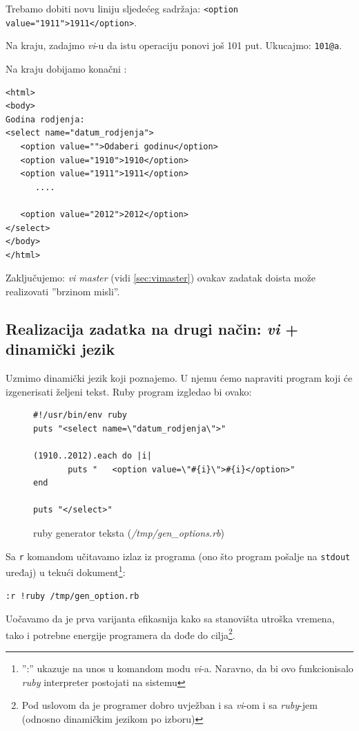 \documentclass[times, utf8, seminar]{fit}
\begin{document}
Trebamo dobiti novu liniju sljedećeg sadržaja: \verb+<option value="1911">1911</option>+. 

Na kraju, zadajmo \emph{vi}-u da istu operaciju ponovi još 101 put. Ukucajmo: \verb+101@a+. 

Na kraju dobijamo konačni \href{https://gist.github.com/4412263}{\color{blue}{rezultat}}:

\begin{lstlisting}
<html>
<body>
Godina rodjenja:
<select name="datum_rodjenja">
   <option value="">Odaberi godinu</option>
   <option value="1910">1910</option>
   <option value="1911">1911</option>
      ....

   <option value="2012">2012</option>
</select>
</body>
</html>
\end{lstlisting}

Zaključujemo: \emph{vi master} (vidi \ref{sec:vimaster}) ovakav zadatak doista može realizovati ''brzinom misli''.

\subsection{Realizacija zadatka na drugi način: \emph{vi} + dinamički jezik}

Uzmimo dinamički jezik koji poznajemo. U njemu ćemo napraviti program koji će izgenerisati željeni tekst. Ruby program izgledao bi ovako:

\begin{figure}[H]
\begin{lstlisting}
#!/usr/bin/env ruby
puts "<select name=\"datum_rodjenja\">"

(1910..2012).each do |i|
       puts "   <option value=\"#{i}\">#{i}</option>"	
end

puts "</select>"
\end{lstlisting}
\caption{ruby generator teksta (\emph{/tmp/gen\_options.rb})}
\end{figure}

Sa \verb+r+ komandom učitavamo izlaz iz programa (ono što program pošalje na \verb+stdout+ uređaj) u tekući dokument\footnote{'':'' ukazuje na unos u komandom modu \emph{vi}-a.  Naravno, da bi ovo funkcionisalo \emph{ruby} interpreter postojati na sistemu}:

\begin{lstlisting}
:r !ruby /tmp/gen_option.rb
\end{lstlisting}

Uočavamo da je prva varijanta efikasnija kako sa stanovišta utroška vremena, tako i potrebne energije programera da dođe do cilja\footnote{Pod uslovom da je programer dobro uvježban i sa \emph{vi}-om i sa \emph{ruby}-jem (odnosno dinamičkim jezikom po izboru)}.
\end{document}
